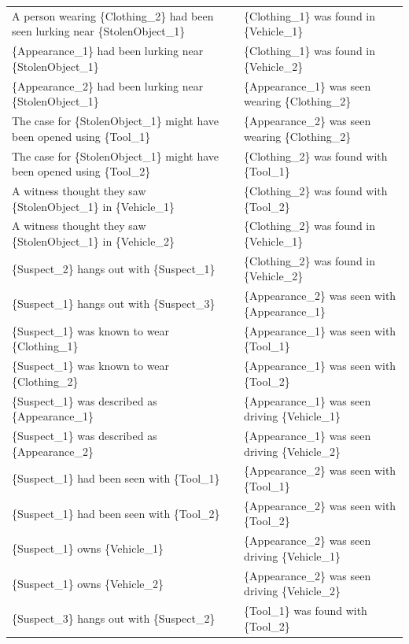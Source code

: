 \documentclass{article}
\begin{document}
\begin{landscape}
\begin{table}[]
\begin{tabular}{ll}
A person   wearing \{Clothing\_2\} had been seen lurking near \{StolenObject\_1\} & \{Clothing\_1\} was found in   \{Vehicle\_1\} \\
\{Appearance\_1\}   had been lurking near \{StolenObject\_1\} & \{Clothing\_1\} was found in   \{Vehicle\_2\} \\
\{Appearance\_2\}   had been lurking near \{StolenObject\_1\} & \{Appearance\_1\} was seen wearing   \{Clothing\_2\} \\
The case   for \{StolenObject\_1\} might have been opened using \{Tool\_1\} & \{Appearance\_2\} was seen wearing   \{Clothing\_2\} \\
The case   for \{StolenObject\_1\} might have been opened using \{Tool\_2\} & \{Clothing\_2\} was found with   \{Tool\_1\} \\
A   witness thought they saw \{StolenObject\_1\} in \{Vehicle\_1\} & \{Clothing\_2\} was found with   \{Tool\_2\} \\
A   witness thought they saw \{StolenObject\_1\} in \{Vehicle\_2\} & \{Clothing\_2\} was found in   \{Vehicle\_1\} \\
\{Suspect\_2\}   hangs out with \{Suspect\_1\} & \{Clothing\_2\} was found in   \{Vehicle\_2\} \\
\{Suspect\_1\}   hangs out with \{Suspect\_3\} & \{Appearance\_2\} was seen with   \{Appearance\_1\} \\
\{Suspect\_1\}   was known to wear \{Clothing\_1\} & \{Appearance\_1\} was seen with   \{Tool\_1\} \\
\{Suspect\_1\}   was known to wear \{Clothing\_2\} & \{Appearance\_1\} was seen with   \{Tool\_2\} \\
\{Suspect\_1\}   was described as \{Appearance\_1\} & \{Appearance\_1\} was seen driving   \{Vehicle\_1\} \\
\{Suspect\_1\}   was described as \{Appearance\_2\} & \{Appearance\_1\} was seen driving   \{Vehicle\_2\} \\
\{Suspect\_1\}   had been seen with \{Tool\_1\} & \{Appearance\_2\} was seen with   \{Tool\_1\} \\
\{Suspect\_1\}   had been seen with \{Tool\_2\} & \{Appearance\_2\} was seen with   \{Tool\_2\} \\
\{Suspect\_1\}   owns \{Vehicle\_1\} & \{Appearance\_2\} was seen driving   \{Vehicle\_1\} \\
\{Suspect\_1\}   owns \{Vehicle\_2\} & \{Appearance\_2\} was seen driving   \{Vehicle\_2\} \\
\{Suspect\_3\}   hangs out with \{Suspect\_2\} & \{Tool\_1\} was found with \{Tool\_2\} \\

\end{tabular}
\end{table}
\end{landscape}
\end{document}
